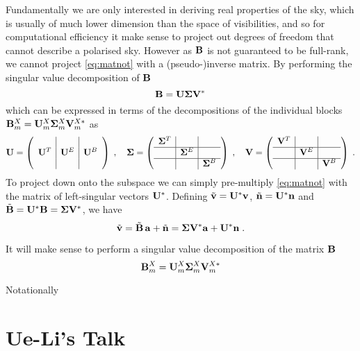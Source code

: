 \documentclass[onecolumn]{revtex4}
\begin{document}
Fundamentally we are only interested in deriving real properties of the sky,
which is usually of much lower dimension than the space of visibilities, and so
for computational efficiency it make sense to project out degrees of freedom
that cannot describe a polarised sky. However as $\mathbf{B}$ is not guaranteed to be
full-rank, we cannot project \eqref{eq:matnot} with a (pseudo-)inverse
matrix. By performing the singular value decomposition of $\mathbf{B}$
\begin{equation}
\mathbf{B} = \mathbf{U} \mathbf{\Sigma} \mathbf{V}^*
\end{equation}
which can be expressed in terms of the decompositions of the individual blocks
$\mathbf{B}^X_m = \mathbf{U}_m^X \mathbf{\Sigma}_m^X \mathbf{V}^{X *}_m$ as
\begin{equation}
\mathbf{U} =  \left(\begin{array}{c|c|c} & & \\ \mathbf{U}^T & \mathbf{U}^E & \mathbf{U}^B \\ &
    &\end{array}\right) \; , \quad
\mathbf{\Sigma} =  \left(\begin{array}{c|c|c} \mathbf{\Sigma}^T & & \\ \hline & \mathbf{\Sigma}^E & \\
    \hline & & \mathbf{\Sigma}^B \end{array}\right)
 \; , \quad
\mathbf{V} =  \left(\begin{array}{c|c|c} \mathbf{V}^T & & \\ \hline & \mathbf{V}^E & \\
    \hline & & \mathbf{V}^B\end{array}\right) \; .
\end{equation}
To project down onto the subspace we can simply pre-multiply \eqref{eq:matnot}
with the matrix of left-singular vectors $\mathbf{U}^*$. Defining $\tilde{\mathbf{v}} =
\mathbf{U}^*\mathbf{v}$, $\tilde{\mathbf{n}} = \mathbf{U}^*\mathbf{n}$ and $\tilde{\mathbf{B}} = \mathbf{U}^*\mathbf{B} = \mathbf{\Sigma}
\mathbf{V}^*$, we have
\begin{equation}
\label{eq:matnot2}
\tilde{\mathbf{v}} = \tilde{\mathbf{B}}\, \mathbf{a} + \tilde{\mathbf{n}} = \mathbf{\Sigma} \mathbf{V}^* \mathbf{a} + \mathbf{U}^* \mathbf{n} \; .
\end{equation}

It will make sense to perform a singular value decomposition of
the matrix $\mathbf{B}$
\begin{equation}
\mathbf{B}^X_m = \mathbf{U}_m^X \mathbf{\Sigma}_m^X \mathbf{V}^{X *}_m
\end{equation}

Notationally



\section{Ue-Li's Talk}
\end{document}
